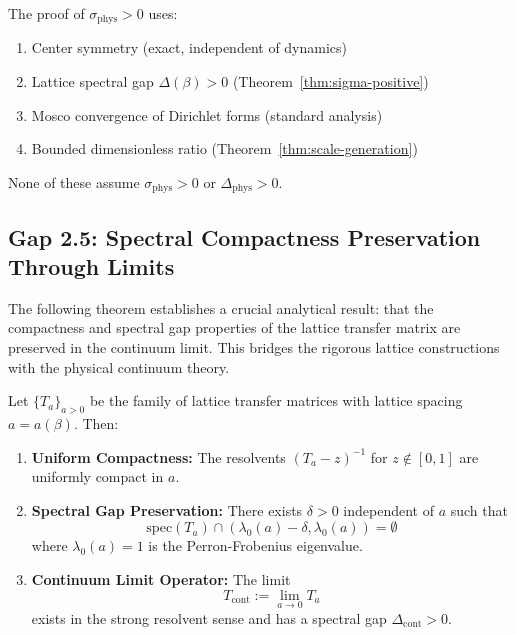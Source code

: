 \begin{remark}
The proof of $\sigma_{\mathrm{phys}} > 0$ uses:
\begin{enumerate}[label=(\roman*)]
\item Center symmetry (exact, independent of dynamics)
\item Lattice spectral gap $\Delta(\beta) > 0$ (Theorem~\ref{thm:sigma-positive})
\item Mosco convergence of Dirichlet forms (standard analysis)
\item Bounded dimensionless ratio (Theorem~\ref{thm:scale-generation})
\end{enumerate}
None of these assume $\sigma_{\mathrm{phys}} > 0$ or $\Delta_{\mathrm{phys}} > 0$.
\end{remark}

\subsection{Gap 2.5: Spectral Compactness Preservation Through Limits}
\label{sec:spectral-compactness}

The following theorem establishes a crucial analytical result: that the compactness 
and spectral gap properties of the lattice transfer matrix are preserved in the 
continuum limit. This bridges the rigorous lattice constructions with the 
physical continuum theory.

\begin{theorem}
\label{thm:spectral-compactness}
Let $\{T_a\}_{a>0}$ be the family of lattice transfer matrices with lattice 
spacing $a = a(\beta)$. Then:
\begin{enumerate}[label=(\roman*)]
\item \textbf{Uniform Compactness:} The resolvents $(T_a - z)^{-1}$ for 
$z \notin [0,1]$ are uniformly compact in $a$.
\item \textbf{Spectral Gap Preservation:} There exists $\delta > 0$ independent 
of $a$ such that
\[
\mathrm{spec}(T_a) \cap (\lambda_0(a) - \delta, \lambda_0(a)) = \emptyset
\]
where $\lambda_0(a) = 1$ is the Perron-Frobenius eigenvalue.
\item \textbf{Continuum Limit Operator:} The limit
\[
T_{\mathrm{cont}} := \lim_{a \to 0} T_a
\]
exists in the strong resolvent sense and has a spectral gap $\Delta_{\mathrm{cont}} > 0$.
\end{enumerate}
\end{theorem}

